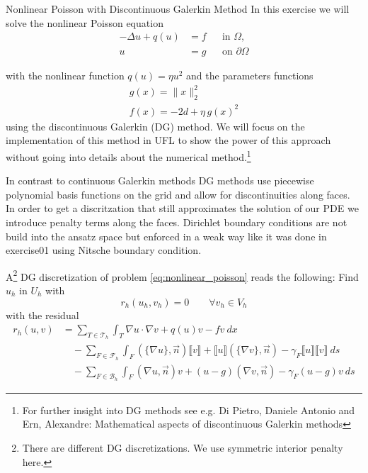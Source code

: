 \documentclass[12pt,a4paper]{article}
\newcommand\jump[1]{\llbracket #1 \rrbracket}
\newcommand\avg[1]{\{ #1 \}}
\begin{document}
\begin{Exercise}{Nonlinear Poisson with Discontinuous Galerkin Method}
  In this exercise we will solve the nonlinear Poisson equation
  \begin{equation}
    \begin{aligned}
      -\Delta u + q(u) &= f &&\text{in $\Omega$},\\
      u &= g &&\text{on $\partial\Omega$}
    \end{aligned}
    \label{eq:nonlinear_poisson}
  \end{equation}

  with the nonlinear function $q(u)=\eta u^2$ and the parameters functions
  \begin{align*}
    g(x) = \|x\|_2^2 \\
    f(x) = -2d + \eta \, g(x)^2
  \end{align*}
  using the discontinuous Galerkin
  (DG) method. We will focus on the implementation of this method in UFL to
  show the power of this approach without going into details about the
  numerical method.\footnote{For further insight into DG methods see e.g. Di Pietro, Daniele Antonio and Ern, Alexandre: Mathematical aspects of discontinuous Galerkin methods}

  In contrast to continuous Galerkin methods DG methods use piecewise
  polynomial basis functions on the grid and allow for discontinuities along
  faces. In order to get a discritzation that still approximates the solution
  of our PDE we introduce penalty terms along the faces. Dirichlet boundary
  conditions are not build into the ansatz space but enforced in a weak way
  like it was done in exercise01 using Nitsche boundary condition.

  A\footnote{There are different DG discretizations. We use symmetric interior penalty here.} DG discretization of problem \eqref{eq:nonlinear_poisson} reads the
  following: Find $u_h$ in $U_h$ with
  \begin{equation*}
    r_h(u_h, v_h) = 0 \qquad \forall v_h \in V_h
  \end{equation*}
  with the residual
  \begin{equation}
    \label{eq:nonlinear_poisson_dg}
    \begin{aligned}
      r_h(u, v) & = \sum_{T\in\mathcal{T}_h}\int_T \nabla u\cdot\nabla v + q(u)v - fv\ dx\\
      &\quad - \sum_{F\in\mathcal{F}_h}\int_F (\avg{\nabla u}, \vec{n})\jump{v} + \jump{u}(\avg{\nabla v}, \vec{n}) - \gamma_F\jump{u}\jump{v}\ ds\\
      &\quad - \sum_{F\in\mathcal{B}_h}\int_F(\nabla u, \vec{n})v + (u-g)(\nabla v, \vec{n}) - \gamma_F(u-g)v\ ds
    \end{aligned}
  \end{equation}


\end{Exercise}
\end{document}
